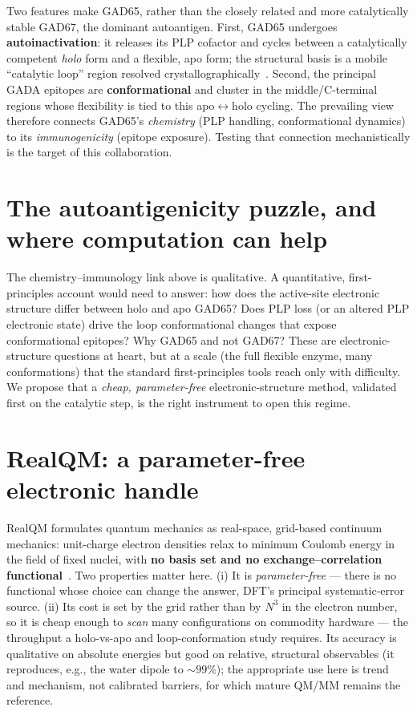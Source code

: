 \documentclass[11pt]{article}
\begin{document}
Two features make GAD65, rather than the closely related and more catalytically stable GAD67, the dominant
autoantigen. First, GAD65 undergoes \textbf{autoinactivation}: it releases its PLP cofactor and cycles between
a catalytically competent \emph{holo} form and a flexible, apo form; the structural basis is a mobile
``catalytic loop'' region resolved crystallographically~\cite{Fenalti2007}. Second, the principal GADA
epitopes are \textbf{conformational} and cluster in the middle/C-terminal regions whose flexibility is tied to
this apo$\leftrightarrow$holo cycling. The prevailing view therefore connects GAD65's \emph{chemistry} (PLP
handling, conformational dynamics) to its \emph{immunogenicity} (epitope exposure). Testing that connection
mechanistically is the target of this collaboration.

\section{The autoantigenicity puzzle, and where computation can help}
The chemistry--immunology link above is qualitative. A quantitative, first-principles account would need to
answer: how does the active-site electronic structure differ between holo and apo GAD65? Does PLP loss (or an
altered PLP electronic state) drive the loop conformational changes that expose conformational epitopes? Why
GAD65 and not GAD67? These are electronic-structure questions at heart, but at a scale (the full flexible
enzyme, many conformations) that the standard first-principles tools reach only with difficulty. We propose
that a \emph{cheap, parameter-free} electronic-structure method, validated first on the catalytic step, is the
right instrument to open this regime.

\section{RealQM: a parameter-free electronic handle}
RealQM formulates quantum mechanics as real-space, grid-based continuum mechanics: unit-charge electron
densities relax to minimum Coulomb energy in the field of fixed nuclei, with \textbf{no basis set and no
exchange--correlation functional}~\cite{realqm}. Two properties matter here. (i) It is \emph{parameter-free}
--- there is no functional whose choice can change the answer, DFT's principal systematic-error source. (ii)
Its cost is set by the grid rather than by $N^3$ in the electron number, so it is cheap enough to \emph{scan}
many configurations on commodity hardware --- the throughput a holo-vs-apo and loop-conformation study
requires. Its accuracy is qualitative on absolute energies but good on relative, structural observables (it
reproduces, e.g., the water dipole to ${\sim}99\%$); the appropriate use here is trend and mechanism, not
calibrated barriers, for which mature QM/MM remains the reference.
\end{document}

